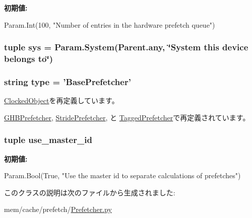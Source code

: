 \label{classPrefetcher_1_1BasePrefetcher_a377e5da8df1f89c5468c8b8cd07eac89}
{\bfseries 初期値:}
\begin{DoxyCode}
Param.Int(100,
         "Number of entries in the hardware prefetch queue")
\end{DoxyCode}
\hypertarget{classPrefetcher_1_1BasePrefetcher_a1f27497e90bf86cc0b513e5c086c9e19}{
\subsubsection[{sys}]{\setlength{\rightskip}{0pt plus 5cm}tuple sys = Param.System(Parent.any, \char`\"{}System this device belongs to\char`\"{})}}
\label{classPrefetcher_1_1BasePrefetcher_a1f27497e90bf86cc0b513e5c086c9e19}
\hypertarget{classPrefetcher_1_1BasePrefetcher_acce15679d830831b0bbe8ebc2a60b2ca}{
\subsubsection[{type}]{\setlength{\rightskip}{0pt plus 5cm}string type = '{\bf BasePrefetcher}'}}
\label{classPrefetcher_1_1BasePrefetcher_acce15679d830831b0bbe8ebc2a60b2ca}


\hyperlink{classClockedObject_1_1ClockedObject_acce15679d830831b0bbe8ebc2a60b2ca}{ClockedObject}を再定義しています。

\hyperlink{classPrefetcher_1_1GHBPrefetcher_acce15679d830831b0bbe8ebc2a60b2ca}{GHBPrefetcher}, \hyperlink{classPrefetcher_1_1StridePrefetcher_acce15679d830831b0bbe8ebc2a60b2ca}{StridePrefetcher}, と \hyperlink{classPrefetcher_1_1TaggedPrefetcher_acce15679d830831b0bbe8ebc2a60b2ca}{TaggedPrefetcher}で再定義されています。\hypertarget{classPrefetcher_1_1BasePrefetcher_a872d17cf1763524380e96f1be5328427}{
\subsubsection[{use\_\-master\_\-id}]{\setlength{\rightskip}{0pt plus 5cm}tuple use\_\-master\_\-id}}
\label{classPrefetcher_1_1BasePrefetcher_a872d17cf1763524380e96f1be5328427}
{\bfseries 初期値:}
\begin{DoxyCode}
Param.Bool(True,
         "Use the master id to separate calculations of prefetches")
\end{DoxyCode}


このクラスの説明は次のファイルから生成されました:\begin{DoxyCompactItemize}
\item 
mem/cache/prefetch/\hyperlink{Prefetcher_8py}{Prefetcher.py}\end{DoxyCompactItemize}
